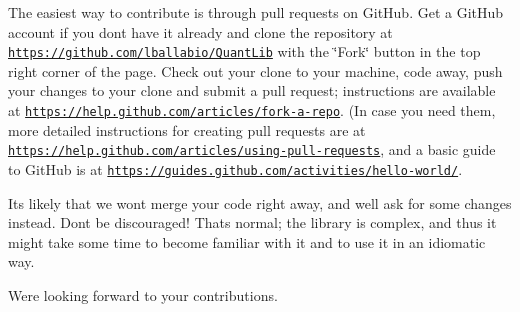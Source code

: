 The easiest way to contribute is through pull requests on Git\+Hub. Get a Git\+Hub account if you don\textquotesingle{}t have it already and clone the repository at \href{https://github.com/lballabio/QuantLib}{\tt https\+://github.\+com/lballabio/\+Quant\+Lib} with the \char`\"{}\+Fork\char`\"{} button in the top right corner of the page. Check out your clone to your machine, code away, push your changes to your clone and submit a pull request; instructions are available at \href{https://help.github.com/articles/fork-a-repo}{\tt https\+://help.\+github.\+com/articles/fork-\/a-\/repo}. (In case you need them, more detailed instructions for creating pull requests are at \href{https://help.github.com/articles/using-pull-requests}{\tt https\+://help.\+github.\+com/articles/using-\/pull-\/requests}, and a basic guide to Git\+Hub is at \href{https://guides.github.com/activities/hello-world/}{\tt https\+://guides.\+github.\+com/activities/hello-\/world/}.

It\textquotesingle{}s likely that we won\textquotesingle{}t merge your code right away, and we\textquotesingle{}ll ask for some changes instead. Don\textquotesingle{}t be discouraged! That\textquotesingle{}s normal; the library is complex, and thus it might take some time to become familiar with it and to use it in an idiomatic way.

We\textquotesingle{}re looking forward to your contributions. 